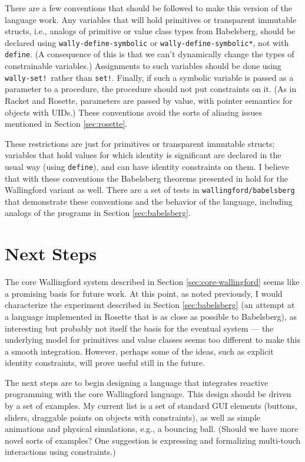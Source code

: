 \documentclass{article}
\begin{document}
There are a few conventions that should be followed to make this version of
the language work.  Any variables that will hold primitives or transparent
immutable structs, i.e., analogs of primitive or value class types from
Babelsberg, should be declared using \verb|wally-define-symbolic| or
\verb|wally-define-symbolic*|, not with \verb|define|.  (A consequence of
this is that we can't dynamically change the types of constrainable
variables.)  Assignments to such variables should be done using
\verb|wally-set!|~rather than \verb|set!|.  Finally, if such a symbolic
variable is passed as a parameter to a procedure, the procedure should not
put constraints on it.  (As in Racket and Rosette, parameters are passed by
value, with pointer semantics for objects with UIDs\@.)  These conventions
avoid the sorts of aliasing issues mentioned in Section \ref{sec:rosette}.

These restrictions are just for primitives or transparent immutable
structs; variables that hold values for which identity is significant are
declared in the usual way (using \verb|define|), and can have identity
constraints on them.  I believe that with these conventions the Babelsberg
theorems presented in \cite{felgentreff-oopsla-2015} hold for the
Wallingford variant as well.  There are a set of tests in
\verb|wallingford/babelsberg| that demonstrate these conventions and the
behavior of the language, including analogs of the programs in Section
\ref{sec:babelsberg}.

\section{Next Steps}
\label{sec:next-steps}

The core Wallingford system described in Section
\ref{sec:core-wallingford} seems like a promising basis for future
work.  At this point, as noted previously, I would characterize the
experiment described in Section \ref{sec:babelsberg} (an attempt at a
language implemented in Rosette that is as close as possible to
Babelsberg), as interesting but probably not itself the basis for the
eventual system --- the underlying model for primitives and value
classes seems too different to make this a smooth integration.
However, perhaps some of the ideas, such as explicit identity
constraints, will prove useful still in the future.

The next steps are to begin designing a language that integrates
reactive programming with the core Wallingford language.  This design
should be driven by a set of examples.  My current list is a set of
standard GUI elements (buttons, sliders, draggable points on objects
with constraints), as well as simple animations and physical
simulations, e.g., a bouncing ball.  (Should we have more novel sorts
of examples?  One suggestion is expressing and formalizing multi-touch
interactions using constraints.)
\end{document}
